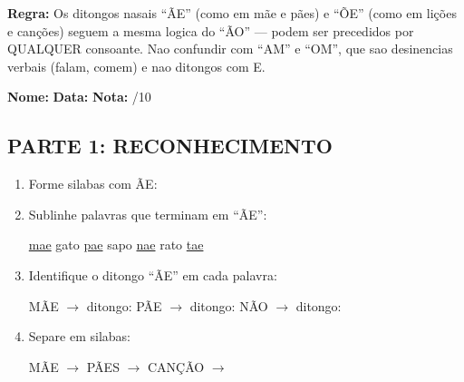 
\textbf{Regra:} Os ditongos nasais ``ÃE'' (como em m\~ae e p\~aes) e ``ÕE'' (como em li\c{c}\~oes e can\c{c}\~oes) seguem a mesma logica do ``ÃO'' --- podem ser precedidos por QUALQUER consoante. Nao confundir com ``AM'' e ``OM'', que sao desinencias verbais (falam, comem) e nao ditongos com E.

\begin{exercicio}
\noindent\textbf{Nome:} \underline{\hspace{3.2cm}} \quad \textbf{Data:} \underline{\hspace{1.6cm}} \quad \textbf{Nota:} \underline{\hspace{0.9cm}}/10

\subsection*{PARTE 1: RECONHECIMENTO}

\begin{enumerate}
  \item Forme silabas com ÃE:
  \begin{center}
  \end{center}

  \item Sublinhe palavras que terminam em ``ÃE'':
  \begin{center}
  \uline{mae} \quad gato \quad \uline{pae} \quad sapo \quad \uline{nae} \quad rato \quad \uline{tae}
  \end{center}

  \item Identifique o ditongo ``ÃE'' em cada palavra:
  \begin{center}
  MÃE $\rightarrow$ ditongo: \underline{\hspace{1cm}} \quad PÃE $\rightarrow$ ditongo: \underline{\hspace{1cm}} \quad NÃO $\rightarrow$ ditongo: \underline{\hspace{1cm}}
  \end{center}

  \item Separe em silabas:
  \begin{center}
  MÃE $\rightarrow$ \underline{\hspace{1cm}} \quad PÃES $\rightarrow$ \underline{\hspace{1cm}} \underline{\hspace{1cm}} \quad CANÇÃO $\rightarrow$ \underline{\hspace{1cm}} \underline{\hspace{1cm}} \underline{\hspace{1cm}}
  \end{center}


\end{enumerate}
\end{exercicio}
